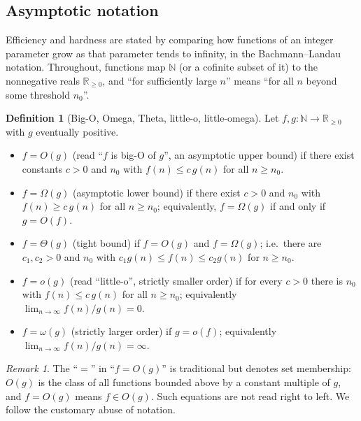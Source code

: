 \documentclass[11pt,a4paper]{article}
\theoremstyle{definition}
\newtheorem{definition}[theorem]{Definition}
\theoremstyle{remark}
\newtheorem{remark}[theorem]{Remark}
\newcommand{\N}{\ensuremath{\mathbb{N}}}
\newcommand{\R}{\ensuremath{\mathbb{R}}}
\begin{document}
\subsection{Asymptotic notation}

Efficiency and hardness are stated by comparing how functions of an
integer parameter grow as that parameter tends to infinity, in the
Bachmann--Landau notation. Throughout,
functions map \(\N\) (or a cofinite subset of it) to the nonnegative
reals \(\R_{\ge 0}\), and ``for sufficiently large \(n\)'' means
``for all \(n\) beyond some threshold \(n_0\)''.

\begin{definition}[Big-O, Omega, Theta, little-o, little-omega]
\label{probability:def-asymp}
Let \(f, g\colon \N \to \R_{\ge 0}\) with \(g\) eventually positive.
\begin{itemize}
\item \(f = O(g)\) (read ``\(f\) is big-O of \(g\)'', an asymptotic
  upper bound) if there exist constants \(c > 0\) and \(n_0\) with
  \(f(n) \le c\,g(n)\) for all \(n \ge n_0\).
\item \(f = \Omega(g)\) (asymptotic lower bound) if there exist
  \(c > 0\) and \(n_0\) with \(f(n) \ge c\,g(n)\) for all
  \(n \ge n_0\); equivalently, \(f = \Omega(g)\) if and only if
  \(g = O(f)\).
\item \(f = \Theta(g)\) (tight bound) if \(f = O(g)\) and
  \(f = \Omega(g)\); i.e.\ there are \(c_1, c_2 > 0\) and \(n_0\)
  with \(c_1 g(n) \le f(n) \le c_2 g(n)\) for \(n \ge n_0\).
\item \(f = o(g)\) (read ``little-o'', strictly smaller order) if for
  every \(c > 0\) there is \(n_0\) with \(f(n) \le c\,g(n)\) for all
  \(n \ge n_0\); equivalently \(\lim_{n\to\infty} f(n)/g(n) = 0\).
\item \(f = \omega(g)\) (strictly larger order) if \(g = o(f)\);
  equivalently \(\lim_{n\to\infty} f(n)/g(n) = \infty\).
\end{itemize}
\end{definition}

\begin{remark}\label{probability:rem-asymp-eq}
The ``\(=\)'' in ``\(f = O(g)\)'' is traditional but denotes set
membership: \(O(g)\) is the class of all functions bounded above by a
constant multiple of \(g\), and \(f = O(g)\) means \(f \in O(g)\).
Such equations are not read right to left. We follow the customary
abuse of notation.
\end{remark}
\end{document}
